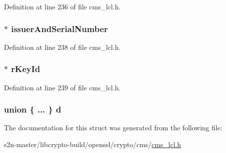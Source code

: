 Definition at line 236 of file cms\+\_\+lcl.\+h.

\subsubsection[{\texorpdfstring{issuer\+And\+Serial\+Number}{issuerAndSerialNumber}}]{$\ast$ issuer\+And\+Serial\+Number}\hypertarget{struct_c_m_s___key_agree_recipient_identifier__st_a19b1fce417820be55efb728bcb0877bf}{}\label{struct_c_m_s___key_agree_recipient_identifier__st_a19b1fce417820be55efb728bcb0877bf}


Definition at line 238 of file cms\+\_\+lcl.\+h.

\subsubsection[{\texorpdfstring{r\+Key\+Id}{rKeyId}}]{$\ast$ r\+Key\+Id}\hypertarget{struct_c_m_s___key_agree_recipient_identifier__st_a7cd33055e67ff40a2cdc012091efff0f}{}\label{struct_c_m_s___key_agree_recipient_identifier__st_a7cd33055e67ff40a2cdc012091efff0f}


Definition at line 239 of file cms\+\_\+lcl.\+h.

\subsubsection[{\texorpdfstring{d}{d}}]{\setlength{\rightskip}{0pt plus 5cm}union \{ ... \}   d}\hypertarget{struct_c_m_s___key_agree_recipient_identifier__st_a08129f0738ff51df86b71beeadade116}{}\label{struct_c_m_s___key_agree_recipient_identifier__st_a08129f0738ff51df86b71beeadade116}


The documentation for this struct was generated from the following file\+:\begin{DoxyCompactItemize}
\item 
s2n-\/master/libcrypto-\/build/openssl/crypto/cms/\hyperlink{cms__lcl_8h}{cms\+\_\+lcl.\+h}\end{DoxyCompactItemize}
